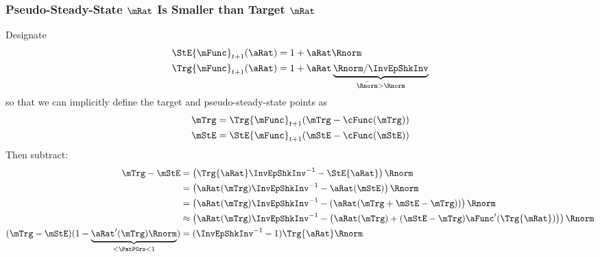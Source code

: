 \documentclass[\econtexRoot/BufferStockTheory]{subfiles}
\begin{document}
\subsubsection{Pseudo-Steady-State $\mRat$ Is Smaller than Target $\mRat$}
Designate
\begin{equation}\begin{split}
  \StE{\mFunc}_{t+1}(\aRat) %
   & = 1+\aRat\Rnorm
\\  \Trg{\mFunc}_{t+1}(\aRat)%
 & = 1+\aRat\underbrace{\Rnorm/\InvEpShkInv}_{\bar{\Rnorm} > \Rnorm}
\end{split}\end{equation}
so that we can implicitly define the target and pseudo-steady-state points as
\begin{equation}\begin{split}
  \mTrg & =\Trg{\mFunc}_{t+1}(\mTrg-\cFunc(\mTrg))
  \\ \mStE & = \StE{\mFunc}_{t+1}(\mStE-\cFunc(\mStE))
\end{split}\end{equation}
Then subtract:
\begin{equation}\begin{split}
  \mTrg - \mStE %
 & = \left(\Trg{\aRat} \InvEpShkInv^{-1} - \StE{\aRat} \right)\Rnorm 
\\ & = \left({\aRat}(\mTrg) \InvEpShkInv^{-1} - {\aRat}(\mStE) \right)\Rnorm 
\\ & = \left({\aRat}(\mTrg) \InvEpShkInv^{-1} - \left({\aRat}(\mTrg+\mStE-\mTrg)\right) \right)\Rnorm 
\\ & \approx \left({\aRat}(\mTrg) \InvEpShkInv^{-1} - \left({\aRat}(\mTrg)+(\mStE-\mTrg)\aFunc^{\prime}(\Trg{\mRat})\right) \right)\Rnorm 
  \\ (\mTrg - \mStE)(1-\underbrace{{\aRat}^{\prime}(\mTrg)\Rnorm}_{< \PatPGro < 1}) & = (\InvEpShkInv^{-1} - 1)\Trg{\aRat}\Rnorm
\end{split}\end{equation}
\end{document}
